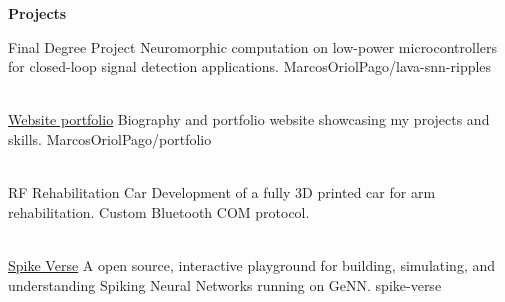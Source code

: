 \begin{tcolorbox}[vercelcard]
\textcolor{DockerBlue}{\large\textbf{Projects}}

\vspace{8pt}

\projectitem
    {Final Degree Project}
    {Neuromorphic computation on low-power microcontrollers for closed-loop signal detection applications.}
    {MarcosOriolPago/lava-snn-ripples}

\vspace{4pt}
\\[10pt]

\projectitem
    {\href{https://marcos.oriol-tech.com}{\faGlobe Website portfolio}}
    {Biography and portfolio website showcasing my projects and skills.}
    {MarcosOriolPago/portfolio}
    
\vspace{4pt}
\\[10pt]

\projectitem
    {RF Rehabilitation Car}
    {Development of a fully 3D printed car for arm rehabilitation. Custom Bluetooth COM protocol.}
    {}

\\[10pt]

\projectitem
    {\href{https://spike-verse.oriol-tech.com}{\faGlobe Spike Verse}}
    {A open source, interactive playground for building, simulating, and understanding Spiking Neural Networks running on GeNN.}
    {spike-verse}

\vspace{4pt}
\\[10pt]

\end{tcolorbox}
